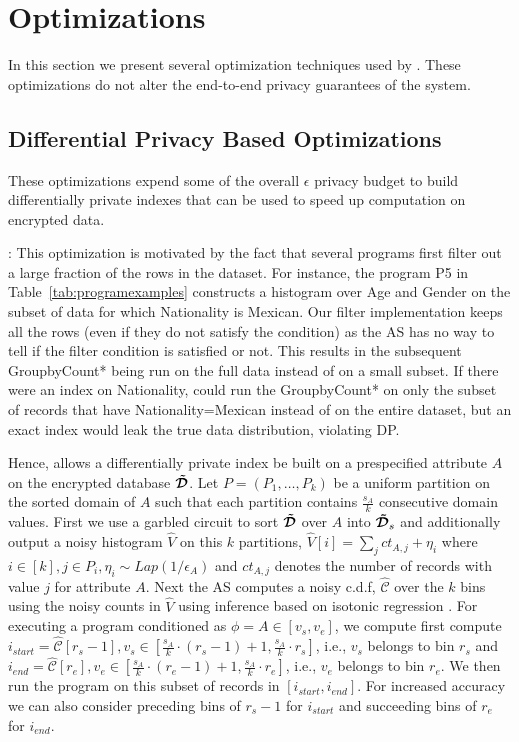 \section{\system Optimizations}\label{sec:optimization}
In this section we present several optimization techniques used by \system. These optimizations do not alter the end-to-end privacy guarantees of the system. 
\subsection{Differential Privacy Based Optimizations}\label{sec:dp_optimization}
These optimizations expend some of the overall $\epsilon$ privacy budget to build differentially private indexes that can be used to speed up computation on encrypted data.

: This optimization is motivated by the fact that several programs first filter out a large fraction of the rows in the dataset. For instance, the program  P5 in Table~\ref{tab:programexamples} constructs a histogram over Age and Gender on the subset of data for which Nationality is Mexican. Our filter implementation keeps all the rows (even if they do not satisfy the condition) as the \textsf{AS} has no way to tell if the filter condition is satisfied or not. This results in the subsequent GroupbyCount* being run on the full data instead of on a small subset. If there were an index on Nationality,  \system could run the GroupbyCount* on only the subset of records that have Nationality=Mexican instead of on the entire dataset, but an exact index would leak the true data distribution, violating DP. 

Hence, \system allows a differentially private index be built on a prespecified attribute $A$ on the encrypted database $\boldsymbol{\tilde{\mathcal{D}}}$.   Let $P=(P_1,\ldots,P_k)$ be a uniform partition on the sorted domain of $A$ such that each partition contains $\frac{s_A}{k}$ consecutive domain values. First we use a garbled circuit to sort $\boldsymbol{\tilde{\mathcal{D}}}$ over $A$ into $\boldsymbol{\tilde{\mathcal{D}}}_s$ and additionally output a noisy histogram $\hat{V}$ on this $k$ partitions, $\hat{V}[i]=\sum_j ct_{A,j}+\eta_i$ where $i \in [k], j \in P_i, \eta_i\sim Lap(1/\epsilon_A)$ and $ct_{A,j}$ denotes the number of records with value $j$ for attribute $A$. 
Next the \textsf{AS} computes a noisy c.d.f, $\hat{\mathcal{C}}$ over the $k$ bins using the noisy counts in $\hat{V}$ using inference based on isotonic regression \cite{cdf}. For executing a program conditioned as $\phi=A \in [v_s,v_e]$, we compute first compute $i_{start}=\hat{\mathcal{C}}[r_s-1], v_s \in [\frac{s_A}{k}\cdot(r_s-1)+1,\frac{s_A}{k}\cdot r_s]$, i.e., $v_s$ belongs to bin $r_s$   and  $i_{end}=\hat{\mathcal{C}}[r_e], v_e \in [\frac{s_A}{k}\cdot(r_e-1)+1,\frac{s_A}{k}\cdot r_e]$, i.e., $v_e$ belongs to bin $r_e$. We then run the program on this subset of records in $[i_{start},i_{end}]$. For increased accuracy we can also consider preceding bins of $r_s-1$ for $i_{start}$ and succeeding bins of $r_e$ for $i_{end}$.

